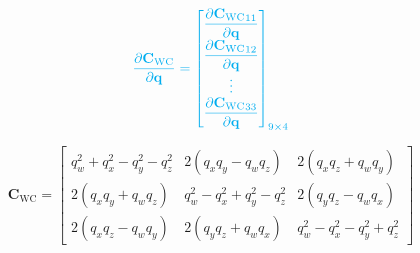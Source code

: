 \documentclass{report}
\renewcommand{\Vec}[1]{{\mathbf{#1}}}
\newcommand{\Mat}[1]{{\mathbf{#1}}}
\newcommand{\quat}{{\Vec{q}}}
\newcommand{\cam}{{\text{C}}}
\newcommand{\world}{{\text{W}}}
\newcommand{\KineNotationTransform}[3]{{{#1}_{#2#3}}}
\newcommand{\rot}{{\Mat{C}}}
\newcommand{\Rot}[2]{{\KineNotationTransform{\rot}{#1}{#2}}}
\newcommand{\camRot}{{\Rot{\world}{\cam}}}
\begin{document}
\begin{align}
  \color{cyan}
  \dfrac{\partial{\camRot}}{\partial{\quat}} =
  \begin{bmatrix}
    \dfrac{\partial{\camRot_{11}}}{\partial{\quat}} \\
    \dfrac{\partial{\camRot_{12}}}{\partial{\quat}} \\
    \vdots \\
    \dfrac{\partial{\camRot_{33}}}{\partial{\quat}}
  \end{bmatrix}_{9 \times 4}
\end{align}

\begin{equation}
  \camRot = \begin{bmatrix}
    q_{w}^{2} + q_{x}^{2} - q_{y}^{2} - q_{z}^{2}
    & 2 (q_{x} q_{y} - q_{w} q_{z})
    & 2 (q_{x} q_{z} + q_{w} q_{y}) \\
    2 (q_{x} q_{y} + q_{w} q_{z})
    & q_{w}^{2} - q_{x}^{2} + q_{y}^{2} - q_{z}^{2}
    & 2 (q_{y} q_{z} - q_{w} q_{x}) \\
    2 (q_{x} q_{z} - q_{w} q_{y})
    & 2 (q_{y} q_{z} + q_{w} q_{x})
    & q_{w}^{2} - q_{x}^{2} - q_{y}^{2} + q_{z}^{2}
  \end{bmatrix}
  \nonumber
\end{equation}
\end{document}
